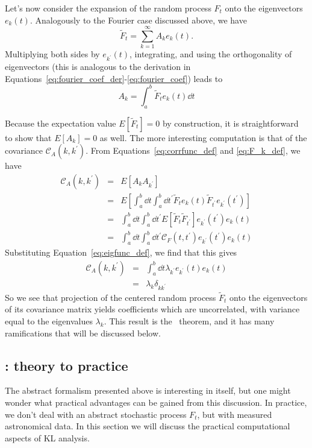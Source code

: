 Let's now consider the expansion of the random process $F_t$ onto the
eigenvectors $e_k(t)$.  Analogously to the Fourier case discussed
above, we have
\begin{equation}
  \tilde{F}_t = \sum_{k=1}^\infty A_k e_k(t).
\end{equation}
Multiplying both sides by $e_{k^\prime}(t)$, integrating, and using the
orthogonality of eigenvectors (this is analogous to the derivation
in Equations~\ref{eq:fourier_coef_der}-\ref{eq:fourier_coef}) leads to
\begin{equation}
  \label{eq:F_k_def}
  A_k = \int_a^b \tilde{F}_t e_k(t) \dd t
\end{equation}

Because the expectation value $E[\tilde{F}_t] = 0$ by construction, it
is straightforward to show that $E[A_k] = 0$ as well.  The more interesting
computation is that of the covariance $\mathcal{C}_A(k, k^\prime)$.
From Equations~\ref{eq:corrfunc_def} and \ref{eq:F_k_def}, we have
\begin{eqnarray}
  \mathcal{C}_A(k, k^\prime)
  &=& E[A_k A_{k^\prime}]\nonumber\\
  &=& E\left[\int_a^b \dd t \int_a^b \dd t^\prime
    \tilde{F}_t e_k(t)
    \tilde{F}_{t^\prime} e_{k^\prime}(t^\prime)\right] \nonumber\\
  &=& \int_a^b \dd t \int_a^b \dd t^\prime
    E[\tilde{F}_t \tilde{F}_{t^\prime}]
    e_{k^\prime}(t^\prime) e_k(t) \nonumber\\
  &=& \int_a^b \dd t \int_a^b \dd t^\prime
    \mathcal{C}_F(t, t^\prime)
    e_{k^\prime}(t^\prime) e_k(t) \nonumber
\end{eqnarray}
Substituting Equation~\ref{eq:eigfunc_def}, we find that this gives
\begin{eqnarray}
  \mathcal{C}_A(k, k^\prime)
  &=& \int_a^b \dd t \lambda_{k^\prime} e_{k^\prime}(t) e_k(t) \nonumber\\
  &=& \lambda_k \delta_{kk^\prime}
\end{eqnarray}
So we see that projection of the centered random process $\tilde{F}_t$ onto
the eigenvectors of its covariance matrix yields coefficients which
are uncorrelated, with variance equal to the eigenvalues $\lambda_k$.
This result is the \KL\ theorem, and it has many ramifications that will
be discussed below.

\subsection{\KL: theory to practice}
The abstract formalism presented above is interesting in itself, but one
might wonder what practical advantages can be gained from this discussion.
In practice, we don't deal with an abstract stochastic process $F_t$, but
with measured astronomical data.  In this section we will discuss the
practical computational aspects of KL analysis.

